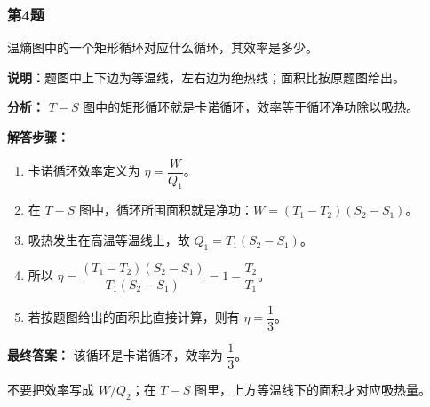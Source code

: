 \documentclass[12pt,a4paper]{ctexart}
\begin{document}
\subsubsection*{第4题}
\begin{tcolorbox}[colback=gray!2!white,colframe=black!60,title={题目}]
温熵图中的一个矩形循环对应什么循环，其效率是多少。\par
\vspace{0.4em}
\textbf{说明：}题图中上下边为等温线，左右边为绝热线；面积比按原题图给出。\par
\end{tcolorbox}
\begin{tcolorbox}[colback=blue!2!white,colframe=blue!55!black,title={完整答案}]
\textbf{分析：}
\(T-S\) 图中的矩形循环就是卡诺循环，效率等于循环净功除以吸热。\par
\textbf{解答步骤：}
\begin{enumerate}
\item 卡诺循环效率定义为 \(\eta=\dfrac{W}{Q_1}\)。
\item 在 \(T-S\) 图中，循环所围面积就是净功：\(W=(T_1-T_2)(S_2-S_1)\)。
\item 吸热发生在高温等温线上，故 \(Q_1=T_1(S_2-S_1)\)。
\item 所以 \(\eta=\dfrac{(T_1-T_2)(S_2-S_1)}{T_1(S_2-S_1)}=1-\dfrac{T_2}{T_1}\)。
\item 若按题图给出的面积比直接计算，则有 \(\eta=\dfrac13\)。
\end{enumerate}
\textbf{最终答案：}
该循环是卡诺循环，效率为 \(\dfrac13\)。\par
\end{tcolorbox}
\begin{tcolorbox}[colback=red!2!white,colframe=red!55!black,title={易错点}]
不要把效率写成 \(W/Q_2\)；在 \(T-S\) 图里，上方等温线下的面积才对应吸热量。\par
\end{tcolorbox}
\end{document}
